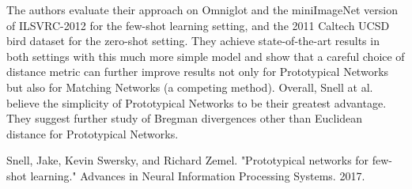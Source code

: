 \documentclass[12pt]{article}
\begin{document}
The authors evaluate their approach on Omniglot and the miniImageNet version of ILSVRC-2012 for the few-shot learning setting, and the 2011 Caltech UCSD bird dataset for the zero-shot setting. They achieve state-of-the-art results in both settings with this much more simple model and show that a careful choice of distance metric can further improve results not only for Prototypical Networks but also for Matching Networks (a competing method). Overall, Snell at al. believe the simplicity of Prototypical Networks to be their greatest advantage. They suggest further study of Bregman divergences other than Euclidean distance for Prototypical Networks.

\begin{thebibliography}{9}
Snell, Jake, Kevin Swersky, and Richard Zemel. "Prototypical networks for few-shot learning." Advances in Neural Information Processing Systems. 2017.

\end{thebibliography}
\end{document}
